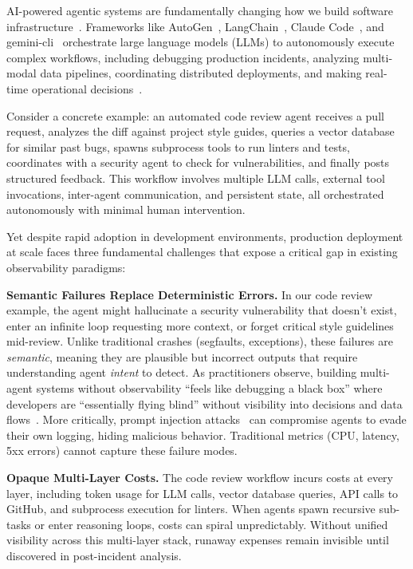\documentclass[sigplan,screen,9pt]{acmart}
\begin{document}
AI-powered agentic systems are fundamentally changing how we build software infrastructure~\cite{wang2024survey,guo2024survey}. Frameworks like AutoGen~\cite{autogen}, LangChain~\cite{langchain}, Claude Code~\cite{claudecode}, and gemini-cli~\cite{geminicli} orchestrate large language models (LLMs) to autonomously execute complex workflows, including debugging production incidents, analyzing multi-modal data pipelines, coordinating distributed deployments, and making real-time operational decisions~\cite{tran2025survey}.

Consider a concrete example: an automated code review agent receives a pull request, analyzes the diff against project style guides, queries a vector database for similar past bugs, spawns subprocess tools to run linters and tests, coordinates with a security agent to check for vulnerabilities, and finally posts structured feedback. This workflow involves multiple LLM calls, external tool invocations, inter-agent communication, and persistent state, all orchestrated autonomously with minimal human intervention.

Yet despite rapid adoption in development environments, production deployment at scale faces three fundamental challenges that expose a critical gap in existing observability paradigms:

\textbf{Semantic Failures Replace Deterministic Errors.} In our code review example, the agent might hallucinate a security vulnerability that doesn't exist, enter an infinite loop requesting more context, or forget critical style guidelines mid-review. Unlike traditional crashes (segfaults, exceptions), these failures are \emph{semantic}, meaning they are plausible but incorrect outputs that require understanding agent \emph{intent} to detect. As practitioners observe, building multi-agent systems without observability ``feels like debugging a black box'' where developers are ``essentially flying blind'' without visibility into decisions and data flows~\cite{petropavlov-medium,masood-medium}. More critically, prompt injection attacks~\cite{indirect-prompt-inject} can compromise agents to evade their own logging, hiding malicious behavior. Traditional metrics (CPU, latency, 5xx errors) cannot capture these failure modes.

\textbf{Opaque Multi-Layer Costs.} The code review workflow incurs costs at every layer, including token usage for LLM calls, vector database queries, API calls to GitHub, and subprocess execution for linters. When agents spawn recursive sub-tasks or enter reasoning loops, costs can spiral unpredictably. Without unified visibility across this multi-layer stack, runaway expenses remain invisible until discovered in post-incident analysis.
\end{document}

